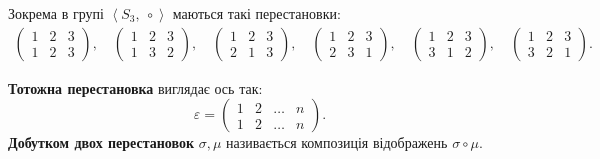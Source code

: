 \documentclass{math_library}
\begin{document}
\begin{example}
Зокрема в групі $\left< S_3,\ \circ \right>$ маються такі перестановки:
\begin{align*}
\begin{pmatrix}
1 & 2 & 3 \\
1 & 2 & 3
\end{pmatrix},\quad \begin{pmatrix}
1 & 2 & 3 \\
1 & 3 & 2
\end{pmatrix},\quad \begin{pmatrix}
1 & 2 & 3 \\
2 & 1 & 3
\end{pmatrix},\quad \begin{pmatrix}
1 & 2 & 3 \\
2 & 3 & 1
\end{pmatrix},\quad \begin{pmatrix}
1 & 2 & 3 \\
3 & 1 & 2
\end{pmatrix},\quad \begin{pmatrix}
1 & 2 & 3 \\
3 & 2 & 1
\end{pmatrix}.
\end{align*}
\end{example}

\textbf{Тотожна перестановка} виглядає ось так: 
\[ \varepsilon = \begin{pmatrix}
1 & 2 & \dots & n \\
1 & 2 & \dots & n
\end{pmatrix}. \]
\textbf{Добутком двох перестановок} $\sigma,\mu$ називається композиція відображень $\sigma \circ \mu$.
\end{document}
